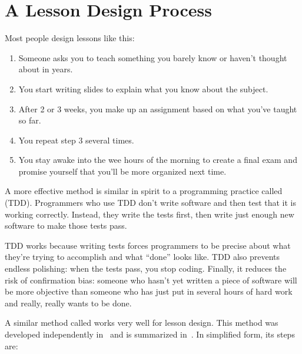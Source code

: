\chapter{A Lesson Design Process}\label{s:process}

Most people design lessons like this:

\begin{enumerate}

\item
  Someone asks you to teach something you barely know
  or haven't thought about in years.

\item
  You start writing slides to explain what you know about the subject.

\item
  After 2 or 3 weeks,
  you make up an assignment based on what you've taught so far.

\item
  You repeat step 3 several times.

\item
  You stay awake into the wee hours of the morning
  to create a final exam
  and promise yourself that you'll be more organized next time.

\end{enumerate}

A more effective method is similar in spirit to a programming practice called
 (TDD).
Programmers who use TDD don't write software
and then test that it is working correctly.
Instead,
they write the tests first,
then write just enough new software to make those tests pass.

TDD works because writing tests forces programmers to be precise about
what they're trying to accomplish and what ``done'' looks like.
TDD also prevents endless polishing:
when the tests pass, you stop coding.
Finally,
it reduces the risk of confirmation bias:
someone who hasn't yet written a piece of software
will be more objective than someone who has just put in several hours of hard work
and really, really wants to be done.

A similar method called  works very well for lesson design.
This method was developed independently in~\cite{Wigg2005,Bigg2011,Fink2013}
and is summarized in~\cite{McTi2013}.
In simplified form, its steps are:

